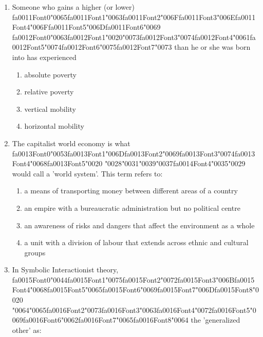 \documentclass[12pt]{article}
\begin{document}
\begin{enumerate}[label=\arabic*.]
\begin{enumerate}[label=(\alph*)]
\end{enumerate}
\item Someone who gains a higher (or lower) {\csname fa0011Font0\endcsname\char"0065}{\csname fa0011Font1\endcsname\char"0063}{\csname fa0011Font2\endcsname\char"006F}{\csname fa0011Font3\endcsname\char"006E}{\csname fa0011Font4\endcsname\char"006F}{\csname fa0011Font5\endcsname\char"006D}{\csname fa0011Font6\endcsname\char"0069} {\csname fa0012Font0\endcsname\char"0063}{\csname fa0012Font1\endcsname\char"0020}{\char"0073}{\csname fa0012Font3\endcsname\char"0074}{\csname fa0012Font4\endcsname\char"0061}{\csname fa0012Font5\endcsname\char"0074}{\csname fa0012Font6\endcsname\char"0075}{\csname fa0012Font7\endcsname\char"0073} than he or she was born into has experienced
\begin{enumerate}[label=(\alph*)]
    \item absolute poverty
    \item relative poverty
    \item vertical mobility
    \item horizontal mobility
\end{enumerate}
\item The capitalist world economy is what {\csname fa0013Font0\endcsname\char"0053}{\csname fa0013Font1\endcsname\char"006D}{\csname fa0013Font2\endcsname\char"0069}{\csname fa0013Font3\endcsname\char"0074}{\csname fa0013Font4\endcsname\char"0068}{\csname fa0013Font5\endcsname\char"0020} {\char"0028}{\char"0031}{\char"0039}{\char"0037}{\csname fa0014Font4\endcsname\char"0035}{\char"0029} would call a 'world system'. This term refers to:
\begin{enumerate}[label=(\alph*)]
    \item a means of transporting money between different areas of a country
    \item an empire with a bureaucratic administration but no political centre
    \item an awareness of risks and dangers that affect the environment as a whole
    \item a unit with a division of labour that extends across ethnic and cultural groups
\end{enumerate}
\item In Symbolic Interactionist theory, {\csname fa0015Font0\endcsname\char"0044}{\csname fa0015Font1\endcsname\char"0075}{\csname fa0015Font2\endcsname\char"0072}{\csname fa0015Font3\endcsname\char"006B}{\csname fa0015Font4\endcsname\char"0068}{\csname fa0015Font5\endcsname\char"0065}{\csname fa0015Font6\endcsname\char"0069}{\csname fa0015Font7\endcsname\char"006D}{\csname fa0015Font8\endcsname\char"0020} {\char"0064}{\char"0065}{\csname fa0016Font2\endcsname\char"0073}{\csname fa0016Font3\endcsname\char"0063}{\csname fa0016Font4\endcsname\char"0072}{\csname fa0016Font5\endcsname\char"0069}{\csname fa0016Font6\endcsname\char"0062}{\csname fa0016Font7\endcsname\char"0065}{\csname fa0016Font8\endcsname\char"0064} the 'generalized other' as:

\end{enumerate}
\end{document}
